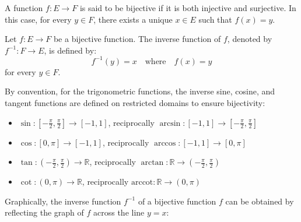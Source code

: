 \begin{definition}[Bijectivity]
    A function $f : E \to F$ is said to be bijective if it is both injective and surjective. In this case, for every $y \in F$, there exists a unique $x \in E$ such that $f(x) = y$.
\end{definition}

\begin{definition}
    Let $f : E \to F$ be a bijective function. The inverse function of $f$, denoted by $f^{-1} : F \to E$, is defined by:
    \[
        f^{-1}(y) = x \quad \text{where} \quad f(x) = y
    \]
    for every $y \in F$.
\end{definition}
By convention, for the trigonometric functions, the inverse sine, cosine, and tangent functions are defined on restricted domains to ensure bijectivity:
\begin{itemize}[itemsep=1pt,label=$\circ$]
    \item $\sin : \left[-\frac{\pi}{2}, \frac{\pi}{2}\right] \to [-1, 1]$, reciprocally $\arcsin : [-1, 1] \to \left[-\frac{\pi}{2}, \frac{\pi}{2}\right]$
    \item $\cos : [0, \pi] \to [-1, 1]$, reciprocally $\arccos : [-1, 1] \to [0, \pi]$
    \item $\tan : \left(-\frac{\pi}{2}, \frac{\pi}{2}\right) \to \mathbb{R}$, reciprocally $\arctan : \mathbb{R} \to \left(-\frac{\pi}{2}, \frac{\pi}{2}\right)$
    \item $\cot : (0, \pi) \to \mathbb{R}$, reciprocally $\text{arccot} : \mathbb{R} \to (0, \pi)$
\end{itemize}
\begin{eg}
    Graphically, the inverse function $f^{-1}$ of a bijective function $f$ can be obtained by reflecting the graph of $f$ across the line $y = x$:
    \begin{center}
    \end{center}
\end{eg}
